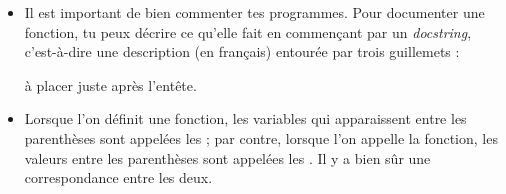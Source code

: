 \documentclass[11pt,class=report,crop=false]{standalone}
\begin{document}
\begin{cours}
\begin{itemize}
  \item Il est important de bien commenter tes programmes. Pour documenter une fonction, tu peux décrire ce qu'elle fait en commençant par un \emph{docstring}, c'est-à-dire une description (en français) entourée par trois guillemets : 
  
  \centerline{}
  
  à placer juste après l'entête.

  
  \item Lorsque l'on définit une fonction, les variables qui apparaissent entre les parenthèses sont appelées les  ; par contre, lorsque l'on appelle la fonction, les valeurs entre les parenthèses sont appelées les . Il y a bien sûr une correspondance entre les deux.

  

\end{itemize}
\end{cours}


\end{document}
